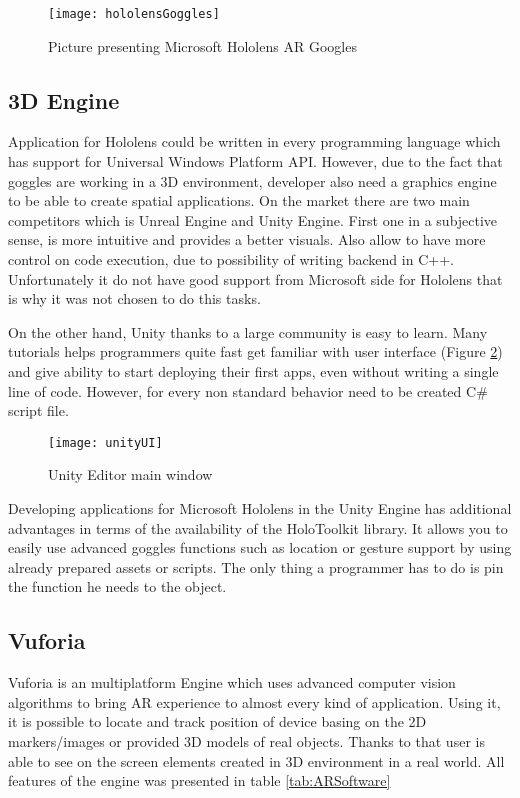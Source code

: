 \documentclass[printmode,en]{mgr}
\begin{document}
\begin{figure}[!ht]
  \centering
    \texttt{[image: hololensGoggles]}
  \caption{Picture presenting Microsoft Hololens AR Googles \cite{hololensGoggles}}
  \label{fig:hololensGoggles}
\end{figure}

\subsection{3D Engine}
Application for Hololens could be written in every programming language which has support for Universal Windows Platform API. However, due to the fact that goggles are working in a 3D environment, developer also need a graphics engine to be able to create spatial applications. On the market there are two main competitors which is Unreal Engine and Unity Engine. First one in a subjective sense, is more intuitive and provides a better visuals. Also allow to have more control on code execution, due to possibility of writing backend in C++. Unfortunately it do not have good support from Microsoft side for Hololens that is why it was not chosen to do this tasks.

On the other hand, Unity thanks to a large community is easy to learn. Many tutorials helps programmers quite fast get familiar with user interface (Figure \ref{fig:unityUI}) and give ability to start deploying their first apps, even without writing a single line of code. However, for every non standard behavior need to be created C\# script file.

\begin{figure}[!ht]
  \centering
    \texttt{[image: unityUI]}
  \caption{Unity Editor main window}
  \label{fig:unityUI}
\end{figure}

Developing applications for Microsoft Hololens in the Unity Engine has additional advantages in terms of the availability of the HoloToolkit library. It allows you to easily use advanced goggles functions such as location or gesture support by using already prepared assets or scripts. The only thing a programmer has to do is pin the function he needs to the object.

\subsection{Vuforia}
Vuforia is an multiplatform Engine which uses advanced computer vision algorithms to bring AR experience to almost every kind of application. Using it, it is possible to locate and track position of device basing on the 2D markers/images or provided 3D models of real objects. Thanks to that user is able to see on the screen elements created in 3D environment in a real world. All features of the engine was presented in table \ref{tab:ARSoftware}
\end{document}
